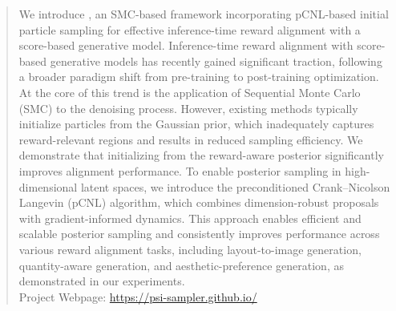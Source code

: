 \begin{abstract}
  We introduce \methodname{}, an SMC-based framework incorporating pCNL-based initial particle sampling for effective inference-time reward alignment with a score-based generative model. Inference-time reward alignment with score-based generative models has recently gained significant traction, following a broader paradigm shift from pre-training to post-training optimization. At the core of this trend is the application of Sequential Monte Carlo (SMC) to the denoising process. However, existing methods typically initialize particles from the Gaussian prior, which inadequately captures reward-relevant regions and results in reduced sampling efficiency. We demonstrate that initializing from the reward-aware posterior significantly improves alignment performance. To enable posterior sampling in high-dimensional latent spaces, we introduce the preconditioned Crank–Nicolson Langevin (pCNL) algorithm, which combines dimension-robust proposals with gradient-informed dynamics. This approach enables efficient and scalable posterior sampling and consistently improves performance across various reward alignment tasks, including layout-to-image generation, quantity-aware generation, and aesthetic-preference generation, as demonstrated in our experiments. \\
  Project Webpage: \textcolor{magenta}{\href{https://psi-sampler.github.io/}{https://psi-sampler.github.io/}}
\end{abstract}